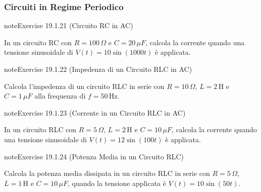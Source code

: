\documentclass[letterpaper,10pt,italian]{jupyterBook}
\begin{document}
\subsubsection{Circuiti in Regime Periodico}
\label{\detokenize{ch/electromagnetism/circuits-electric-problems:circuiti-in-regime-periodico}} \label{exercise:ch/electromagnetism/circuits-electric-problems-exercise-20}

\begin{sphinxadmonition}{note}{Exercise 19.1.21 (Circuito RC in AC)}



\sphinxAtStartPar
In un circuito RC con \(R = 100 \, \Omega\) e \(C = 20 \, \mu F\), calcola la corrente quando una tensione sinusoidale di \(V(t) = 10 \sin(1000 t)\) è applicata.
\end{sphinxadmonition}
 \label{exercise:ch/electromagnetism/circuits-electric-problems-exercise-21}

\begin{sphinxadmonition}{note}{Exercise 19.1.22 (Impedenza di un Circuito RLC in AC)}



\sphinxAtStartPar
Calcola l’impedenza di un circuito RLC in serie con \(R = 10 \, \Omega\), \(L = 2 \, \text{H}\) e \(C = 1 \, \mu F\) alla frequenza di \(f = 50 \, \text{Hz}\).
\end{sphinxadmonition}
 \label{exercise:ch/electromagnetism/circuits-electric-problems-exercise-22}

\begin{sphinxadmonition}{note}{Exercise 19.1.23 (Corrente in un Circuito RLC in AC)}



\sphinxAtStartPar
In un circuito RLC con \(R = 5 \, \Omega\), \(L = 2 \, \text{H}\) e \(C = 10 \, \mu F\), calcola la corrente quando una tensione sinusoidale di \(V(t) = 12 \sin(100 t)\) è applicata.
\end{sphinxadmonition}
 \label{exercise:ch/electromagnetism/circuits-electric-problems-exercise-23}

\begin{sphinxadmonition}{note}{Exercise 19.1.24 (Potenza Media in un Circuito RLC)}



\sphinxAtStartPar
Calcola la potenza media dissipata in un circuito RLC in serie con \(R = 5 \, \Omega\), \(L = 1 \, \text{H}\) e \(C = 10 \, \mu F\), quando la tensione applicata è \(V(t) = 10 \sin(50 t)\).
\end{sphinxadmonition}
 \label{exercise:ch/electromagnetism/circuits-electric-problems-exercise-24}
\end{document}
